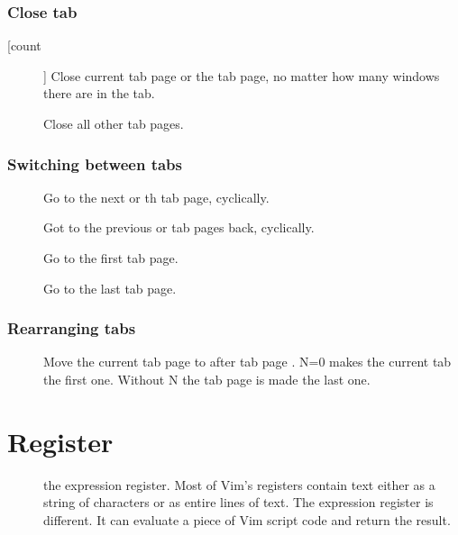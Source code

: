 \section{Close tab}
\begin{description}
  \item[ [count]] Close current tab page or the \syntax{[count]} tab page, no matter how many windows there are in the tab.
  \item[] Close all other tab pages.
\end{description}
\section{Switching between tabs}
\begin{description}
  \item[] 
  \item[] Go to the next or \syntax{[N]}th tab page, cyclically.
  \item[] 
  \item[] Got to the previous or \syntax{[N]} tab pages back, cyclically.
  \item[] Go to the first tab page.
  \item[] Go to the last tab page.
\end{description}
\section{Rearranging tabs}
\begin{description}
  \item[] Move the current tab page to after tab page \syntax{[N]}. N=0 makes the current tab the first one. Without N the tab page is made the last one.
\end{description}
\part{Register}
\begin{description}
  \item[\syntax{=}] the expression register. Most of Vim's registers contain text either as a string of characters or as entire lines of text. The expression register is different. It can evaluate a piece of Vim script code and return the result.
\end{description}

